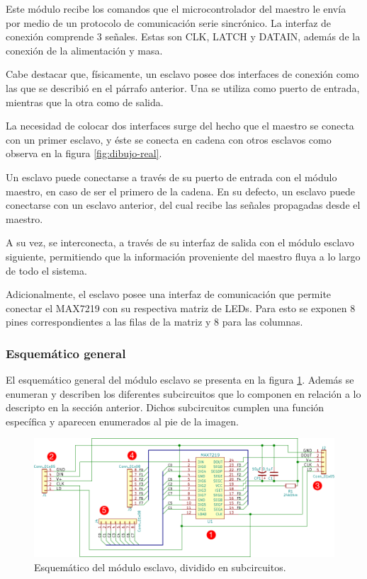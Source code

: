 Este módulo recibe los comandos que el microcontrolador del maestro le envía por medio de un protocolo de comunicación serie sincrónico. La interfaz de conexión comprende 3 señales. Estas son CLK, LATCH y DATAIN, además de la conexión de la alimentación y masa.

Cabe destacar que, físicamente, un esclavo posee dos interfaces de conexión como las que se describió en el párrafo anterior. Una se utiliza como puerto de entrada, mientras que la otra como de salida.

La necesidad de colocar dos interfaces surge del hecho que el maestro se conecta con un primer esclavo, y éste se conecta en cadena con otros esclavos como observa en la figura \ref{fig:dibujo-real}.

Un esclavo puede conectarse a través de su puerto de entrada con el módulo maestro, en caso de ser el primero de la cadena. En su defecto, un esclavo puede conectarse con un esclavo anterior, del cual recibe las señales propagadas desde el maestro.

A su vez, se interconecta, a través de su interfaz de salida con el módulo esclavo siguiente, permitiendo que la información proveniente del maestro fluya a lo largo de todo el sistema.

Adicionalmente, el esclavo posee una interfaz de comunicación que permite conectar el MAX7219 con su respectiva matriz de LEDs. Para esto se exponen 8 pines correspondientes a las filas de la matriz y 8 para las columnas.

\subsubsection{Esquemático general}
El esquemático general del módulo esclavo se presenta en la figura \ref{fig:esquematico-esclavo}.
Además se enumeran y describen los diferentes subcircuitos que lo componen en relación a lo descripto en la sección anterior.
Dichos subcircuitos cumplen una función específica y aparecen enumerados al pie de la imagen.

\begin{figure}[ht!]
	\centering
	\includegraphics[width=\linewidth]{imagenes/esquematico-slave.pdf}
	\caption{Esquemático del módulo esclavo, dividido en subcircuitos.}
	\label{fig:esquematico-esclavo}
\end{figure}

